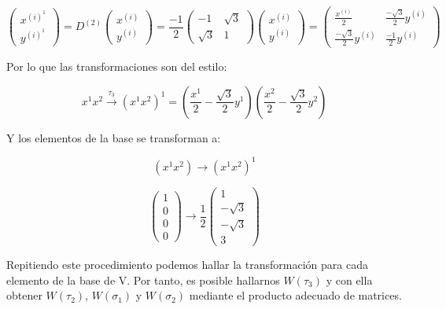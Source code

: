 \documentclass{article}
\begin{document}
\begin{enumerate}
\begin{enumerate}
        $$\left ( \begin{array}{c}
             x^{(i)^1}  \\
               y^{(i)^1}
        \end{array}\right) = D^{(2)} \left ( \begin{array}{c}
             x^{(i)}  \\
               y^{(i)}
        \end{array}\right)=\frac{-1}{2}\left ( \begin{array}{cc}
            -1 & \sqrt{3} \\
               \sqrt{3} & 1
        \end{array}\right)\left ( \begin{array}{c}
             x^{(i)}  \\
               y^{(i)}
        \end{array}\right)= \left ( \begin{array}{cc}
             \frac{x^{(i)}}{2} & \frac{-\sqrt{3}}{2}y^{(i)}  \\
             \frac{-\sqrt{3}}{2}y^{(i)}  & \frac{-1}{2}y^{(i)}
        \end{array}\right)$$

        Por lo que las transformaciones son del estilo:

        $$x^1x^2 \overset{\tau _3}{\longrightarrow} (x^1 x^2)^1=\left ( \frac{x^1}{2}-\frac{\sqrt{3}}{2}y^1 \right) \left ( \frac{x^2}{2}-\frac{\sqrt{3}}{2}y^2 \right)$$

        Y los elementos de la base se transforman a:

        $$(x^1x^2) \longrightarrow (x^1x^2)^1$$

        $$\left( \begin{array}{c}
             1  \\
             0 \\
             0 \\
             0
        \end{array} \right )\longrightarrow \frac{1}{2} \left( \begin{array}{c}
             1  \\
             -\sqrt{3} \\
             -\sqrt{3}\\
             3
        \end{array} \right )$$

        Repitiendo este procedimiento podemos hallar la transformación para cada elemento de la base de V. Por tanto, es posible hallarnos $W(\tau _3)$ y con ella obtener $W(\tau _2)$, $W(\sigma _1)$ y $W(\sigma _2)$ mediante el producto adecuado de matrices.
    \end{enumerate}
\end{enumerate}
\end{document}
